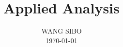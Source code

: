 \documentclass[multixcb, 14pt]{amstext-l}
\theoremstyle{plain}
\theoremstyle{definition}
\begin{document}
\frontmatter

\makeatletter

\makeatother

\title{Applied Analysis}
\author{WANG SIBO\\ \today}

\maketitle

\tableofcontents

\mainmatter




\chapter{}
\chapter{}
\chapter{}
\chapter{}
\chapter{}
\chapter{}
\chapter{}
\chapter{}
\chapter{}
\chapter{}
\chapter{}
\end{document}
